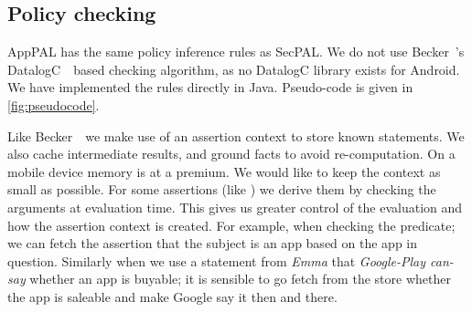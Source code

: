 \documentclass[]{llncs}
\begin{document}
%
%

\subsection{Policy checking}
\label{ssec:eval}

AppPAL has the same policy inference rules as SecPAL.
We do not use Becker~\etal's DatalogC~\cite{Li:2003ix}~based checking algorithm, as no DatalogC library exists for Android.
We have implemented the rules directly in Java.
Pseudo-code is given in \autoref{fig:pseudocode}.

Like Becker~\etal~we make use of an assertion context to store known statements.
We also cache intermediate results, and ground facts to avoid re-computation.
On a mobile device memory is at a premium.
We would like to keep the context as small as possible.
For some assertions (like ) we derive them by checking the arguments at evaluation time.
This gives us greater control of the evaluation and how the assertion context is created.
For example, when checking the  predicate;
  we can fetch the assertion that the subject is an app based on the app in question.
Similarly when we use a statement from \emph{Emma} that \emph{Google-Play can-say} whether an app is buyable;
  it is sensible to go fetch from the store whether the app is saleable and make Google say it then and there.
\end{document}

